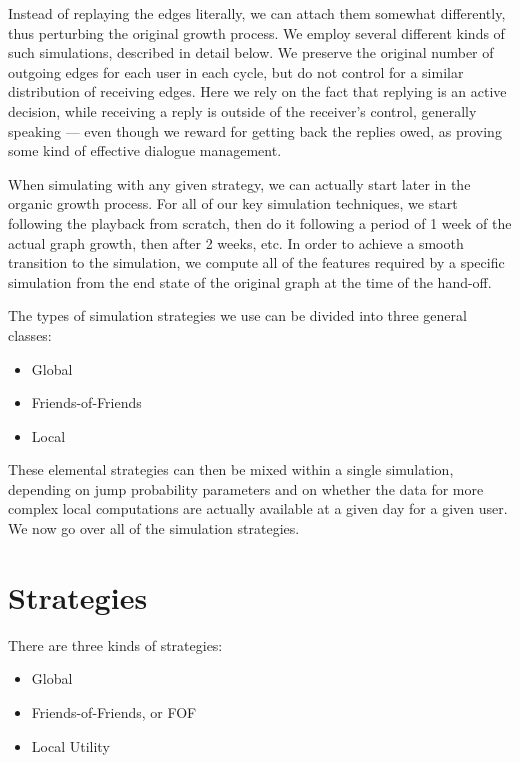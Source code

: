 \documentclass[10pt,oneside]{memoir}
\begin{document}
Instead of replaying the edges literally, we can attach them somewhat differently, thus perturbing the original growth process.  We employ several different kinds of such simulations, described in detail below.  We preserve the original number of outgoing edges for each user in each cycle, but do not control for a similar distribution of receiving edges.  Here we rely on the fact that replying is an active decision, while receiving a reply is outside of the receiver's control, generally speaking --- even though we reward for getting back the replies owed, as proving some kind of effective dialogue management.


When simulating with any given strategy, we can actually start later in the organic growth process.  For all of our key simulation techniques, we start following the playback from scratch, then do it following a period of 1 week of the actual graph growth, then after 2 weeks, etc.  In order to achieve a smooth transition to the simulation, we compute all of the features required by a specific simulation from the end state of the original graph at the time of the hand-off.


The types of simulation strategies we use can be divided into three general classes:


\begin{itemize}


\item Global

\item Friends-of-Friends

\item Local
\end{itemize}

These elemental strategies can then be mixed within a single simulation, depending on jump probability parameters and on whether the data for more complex local computations are actually available at a given day for a given user.  We now go over all of the simulation strategies.


\pagebreak \section{Strategies}
\label{strategies}

There are three kinds of strategies:


\begin{itemize}


\item Global

\item Friends-of-Friends, or FOF

\item Local Utility
\end{itemize}
\end{document}
